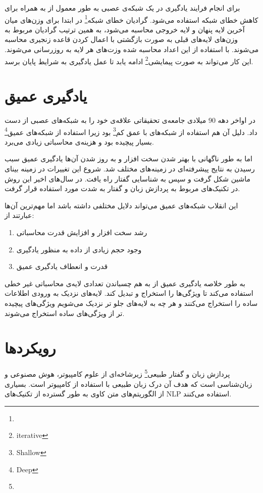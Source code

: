 \documentclass[12pt, a4paper, oneside]{report}
\begin{document}
برای انجام فرایند یادگیری در یک شبکه‌ی عصبی به طور معمول از
به همراه
برای کاهش خطای شبکه استفاده می‌شود. گرادیان
خطای شبکه\footnote{}
در ابتدا برای وزن‌های میان آخرین لایه پنهان و لایه خروجی محاسبه می‌شود، به همین ترتیب گرادیان
مربوط به وزن‌های لایه‌های قبلی به صورت بازگشتی با اعمال کردن قاعده زنجیری محاسبه می‌شوند.
با استفاده از این اعداد محاسبه شده وزت‌های هر لایه به روزرسانی می‌شوند. این کار می‌تواند به صورت
پیمایشی\footnote{iterative}
ادامه یابد تا عمل یادگیری به شرایط پایان برسد.

\section{یادگیری عمیق}
در اواخر دهه 90 میلادی جامعه‌ی تحقیقاتی علاقه‌ی خود را به شبکه‌های عصبی از دست داد. دلیل آن هم استفاده از شبکه‌های
با عمق کم\footnote{Shallow}
بود زیرا استفاده از شبکه‌های عمیق\footnote{Deep}
بسیار پیچیده بود و هزینه‌ی محاسباتی زیادی می‌برد.

اما به طور ناگهانی با بهتر شدن سخت افزار و به روز شدن آن‌ها یادگیری عمیق سبب رسیدن به نتایج پیشرفته‌ای در زمینه‌های مختلف شد.
شروع این تغییرات در زمینه بینای ماشین شکل گرفت و سپس به شناسایی گفتار راه یافت. در سال‌های اخیر این روش در تکنیک‌های
مربوط به پردازش زبان و گفتار به شدت مورد استفاده قرار گرفت.

این انقلاب شبکه‌های عمیق می‌تواند دلایل مختلفی داشته باشد اما مهم‌ترین آن‌ها عبارتند از:

\begin{enumerate}
	\item رشد سخت افزار و افزایش قدرت محاسباتی
	\item وجود حجم زیادی از داده به منظور یادگیری
	\item قدرت و انعطاف یادگیری عمیق
\end{enumerate}

به طور خلاصه یادگیری عمیق از به هم چسباندن تعدادی لایه‌ی محاسباتی غیر خطی استفاده می‌کند تا ویژگی‌ها را استخراج و تبدیل کند.
لایه‌های نزدیک به ورودی اطلاعات ساده را استخراج می‌کنند و هر چه به لایه‌های جلو تر نزدیک می‌شویم ویژگی‌های پیچیده تر
از ویژگی‌های ساده استخراج می‌شوند.

\section{رویکردها}

پردازش زبان و گفتار طبیعی\footnote{}
زیرشاخه‌ای از علوم کامپیوتر، هوش مصنوعی و زبان‌شناسی است که هدف آن درک زبان طبیعی با
استفاده از کامپیوتر است. بسیاری از الگوریتم‌های متن کاوی به طور گسترده از تکنیک‌های
NLP
استفاده می‌کنند\cite{DBLP:journals/corr/AllahyariPASTGK17a}.
\end{document}

